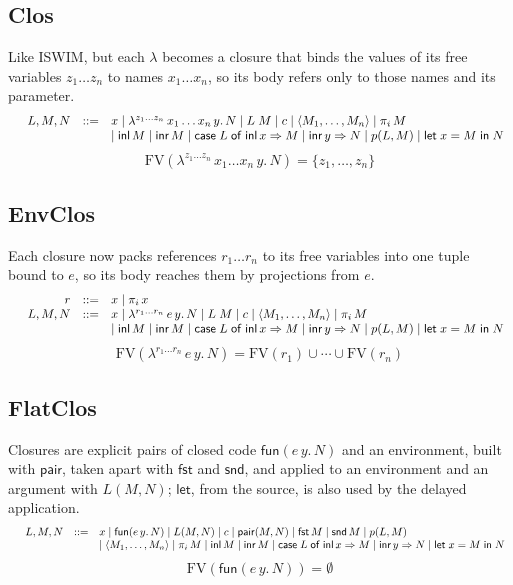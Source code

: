 \documentclass[10pt]{article}
\makeatletter
\theoremstyle{acmplain}
\newcommand{\key}[1]{\mathsf{#1}}
\newcommand{\clos}[2]{\lambda^{#1}\, #2.\,}
\newcommand{\Let}{\key{let}\;}
\newcommand{\In}{\;\key{in}\;}
\newcommand{\inl}{\key{inl}\,}
\newcommand{\inr}{\key{inr}\,}
\newcommand{\Case}[5]{\key{case}\;#1\;\key{of}\;\key{inl}\,#2 \Rightarrow #3 \mid \key{inr}\,#4 \Rightarrow #5}
\newcommand{\tuple}[1]{\langle #1 \rangle}
\newcommand{\prj}[1]{\pi_{#1}\,}
\newcommand{\fun}[1]{\key{fun}(#1)}
\newcommand{\pair}[2]{\key{pair}(#1, #2)}
\newcommand{\FST}{\key{fst}\,}
\newcommand{\SND}{\key{snd}\,}
\newcommand{\prim}[3]{#1(#2, #3)}
\newcommand{\FV}{\mathrm{FV}}
\newenvironment{syntax}{\[\begin{array}{l@{\quad}rcl}}{\end{array}\]}
\makeatother
\begin{document}
\subsection{Clos}

Like ISWIM, but each $\lambda$ becomes a closure that binds the values of its free variables $z_1\ldots z_n$ to names $x_1\ldots x_n$, so its body refers only to those names and its parameter.
\begin{syntax}
  & L, M, N &::=& x \mid \clos{z_1\ldots z_n}{x_1\ldots x_n\, y} N \mid L\;M \mid c
    \mid \tuple{M_1,\ldots,M_n} \mid \prj{i} M \\
  &&& \mid \inl M \mid \inr M \mid \Case{L}{x}{M}{y}{N} \mid \prim{p}{L}{M}
    \mid \Let x = M \In N
\end{syntax}
\[
  \FV(\clos{z_1\ldots z_n}{x_1\ldots x_n\, y} N) = \{z_1, \ldots, z_n\}
\]

\subsection{EnvClos}

Each closure now packs references $r_1\ldots r_n$ to its free variables into one tuple bound to $e$, so its body reaches them by projections from $e$.
\begin{syntax}
  & r &::=& x \mid \prj{i} x \\
  & L, M, N &::=& x \mid \clos{r_1\ldots r_n}{e\, y} N \mid L\;M \mid c
    \mid \tuple{M_1,\ldots,M_n} \mid \prj{i} M \\
  &&& \mid \inl M \mid \inr M \mid \Case{L}{x}{M}{y}{N} \mid \prim{p}{L}{M}
    \mid \Let x = M \In N
\end{syntax}
\[
  \FV(\clos{r_1\ldots r_n}{e\, y} N) = \FV(r_1) \cup \cdots \cup \FV(r_n)
\]

\subsection{FlatClos}

Closures are explicit pairs of closed code $\fun{e\,y.\,N}$ and an environment, built with $\key{pair}$, taken apart with $\key{fst}$ and $\key{snd}$, and applied to an environment and an argument with $L(M, N)$; $\key{let}$, from the source, is also used by the delayed application.
\begin{syntax}
  & L, M, N &::=& x \mid \fun{e\,y.\,N} \mid L(M, N) \mid c
    \mid \pair{M}{N} \mid \FST M \mid \SND M \mid \prim{p}{L}{M} \\
  &&& \mid \tuple{M_1,\ldots,M_n} \mid \prj{i} M
    \mid \inl M \mid \inr M \mid \Case{L}{x}{M}{y}{N}
    \mid \Let x = M \In N
\end{syntax}
\[
  \FV(\fun{e\,y.\,N}) = \emptyset
\]
\end{document}

